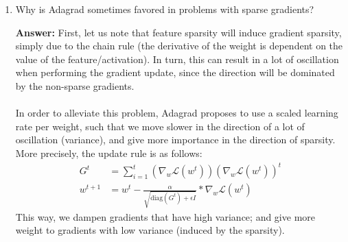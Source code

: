 \documentclass{article}
\newenvironment{QandA}{\begin{enumerate}[label=\arabic*.]}{\end{enumerate}}
\newenvironment{InnerQandA}{\begin{enumerate}[label=\roman*.]}{\end{enumerate}}
\newenvironment{answer}{\par\normalfont \textbf{Answer:}}{}
\begin{document}
\begin{QandA}
\begin{InnerQandA}
        \item What happens when you use the entire training data in a batch?
        \begin{answer}
            After performing a forward pass and a backward pass for each sample in the dataset, we take a step in the direction of the cumulative gradient. This is extremely slow to converge, as today's datasets are extremely large in size, which implies that we perform gradient updates too rarely. 
        \end{answer}

        \item How should we adjust the learning rate as we increase or decrease the batch size?
        \begin{answer}
            When utilizing larger batches, we can afford to have large learning rates, as the approximated gradient of the batch is closer to the true gradient. On the other hand, using very small batches yields noisy estimates of the gradient, and is therefore advisable to also use small learning rates so that we don't diverge in our optimization procedure. 
        \end{answer}
    \end{InnerQandA}

    \item Why is Adagrad sometimes favored in problems with sparse gradients?
    \begin{answer}
        First, let us note that feature sparsity will induce gradient sparsity, simply due to the chain rule (the derivative of the weight is dependent on the value of the feature/activation). In turn, this can result in a lot of oscillation when performing the gradient update, since the direction will be dominated by the non-sparse gradients. \\\\
        In order to alleviate this problem, Adagrad proposes to use a scaled learning rate per weight, such that we move slower in the direction of a lot of oscillation (variance), and give more importance in the direction of sparsity. More precisely, the update rule is as follows:
        \begin{align*}
            G^t &= \sum_{i=1}^t \left(\nabla_w{\mathcal{L}(w^t)}\right) \left(\nabla_w{\mathcal{L}}(w^t)\right)^t \\
            w^{t+1} &= w^t - \frac{\alpha}{\sqrt{\text{diag}(G^t) + \epsilon I}} * \nabla_w \mathcal{L}(w^t)
        \end{align*}
        This way, we dampen gradients that have high variance; and give more weight to gradients with low variance (induced by the sparsity).


\end{answer}
\end{QandA}
\end{document}
